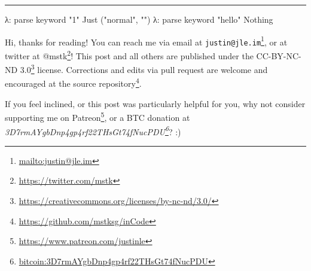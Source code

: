 \documentclass[]{article}
\newenvironment{Shaded}{}{}
\newcommand{\DataTypeTok}[1]{\textcolor[rgb]{0.56,0.13,0.00}{#1}}
\newcommand{\FunctionTok}[1]{\textcolor[rgb]{0.02,0.16,0.49}{#1}}
\newcommand{\NormalTok}[1]{#1}
\newcommand{\StringTok}[1]{\textcolor[rgb]{0.25,0.44,0.63}{#1}}
\renewcommand{\href}[2]{#2\footnote{\url{#1}}}
\begin{document}
\begin{center}\rule{0.5\linewidth}{\linethickness}\end{center}

\begin{Shaded}
\begin{Highlighting}[]
\NormalTok{λ}\FunctionTok{:}\NormalTok{ parse keyword }\StringTok{"1"}
\DataTypeTok{Just}\NormalTok{ (}\StringTok{"normal"}\NormalTok{, }\StringTok{""}\NormalTok{)}
\NormalTok{λ}\FunctionTok{:}\NormalTok{ parse keyword }\StringTok{"hello"}
\DataTypeTok{Nothing}
\end{Highlighting}
\end{Shaded}

Hi, thanks for reading! You can reach me via email at
\href{mailto:justin@jle.im}{\nolinkurl{justin@jle.im}}, or at twitter at
\href{https://twitter.com/mstk}{@mstk}! This post and all others are published
under the \href{https://creativecommons.org/licenses/by-nc-nd/3.0/}{CC-BY-NC-ND
3.0} license. Corrections and edits via pull request are welcome and encouraged
at \href{https://github.com/mstksg/inCode}{the source repository}.

If you feel inclined, or this post was particularly helpful for you, why not
consider \href{https://www.patreon.com/justinle}{supporting me on Patreon}, or a
BTC donation at
\emph{\href{bitcoin:3D7rmAYgbDnp4gp4rf22THsGt74fNucPDU}{3D7rmAYgbDnp4gp4rf22THsGt74fNucPDU}}?
:)
\end{document}
